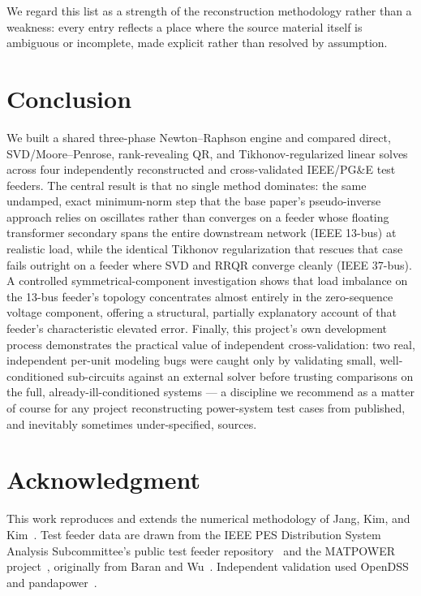 \documentclass[conference]{IEEEtran}
\begin{document}
We regard this list as a strength of the reconstruction methodology rather
than a weakness: every entry reflects a place where the source material
itself is ambiguous or incomplete, made explicit rather than resolved by
assumption.

\section{Conclusion}
\label{sec:conclusion}

We built a shared three-phase Newton--Raphson engine and compared direct,
SVD/Moore--Penrose, rank-revealing QR, and Tikhonov-regularized linear
solves across four independently reconstructed and cross-validated IEEE/PG\&E
test feeders. The central result is that no single method dominates: the
same undamped, exact minimum-norm step that the base paper's pseudo-inverse
approach relies on oscillates rather than converges on a feeder whose
floating transformer secondary spans the entire downstream network (IEEE
13-bus) at realistic load, while the identical Tikhonov regularization that
rescues that case fails outright on a feeder where SVD and RRQR converge
cleanly (IEEE 37-bus). A controlled symmetrical-component investigation
shows that load imbalance on the 13-bus feeder's topology concentrates
almost entirely in the zero-sequence voltage component, offering a
structural, partially explanatory account of that feeder's characteristic
elevated error. Finally, this project's own development process
demonstrates the practical value of independent cross-validation: two real,
independent per-unit modeling bugs were caught only by validating
small, well-conditioned sub-circuits against an external solver before
trusting comparisons on the full, already-ill-conditioned systems --- a
discipline we recommend as a matter of course for any project reconstructing
power-system test cases from published, and inevitably sometimes
under-specified, sources.

\section*{Acknowledgment}
This work reproduces and extends the numerical methodology of Jang,
Kim, and Kim~\cite{jang2023singularity}. Test feeder data are drawn from
the IEEE PES Distribution System Analysis Subcommittee's public test
feeder repository~\cite{ieeetestfeeders} and the MATPOWER
project~\cite{zimmerman2011matpower}, originally from Baran and
Wu~\cite{baran1989network}. Independent validation used
OpenDSS~\cite{opendss} and pandapower~\cite{thurner2018pandapower}.



\end{document}
